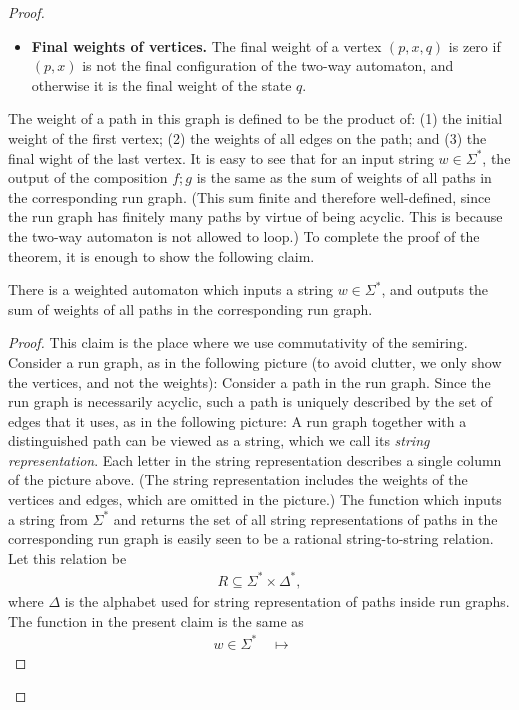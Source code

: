 \begin{proof}
\begin{itemize}
        \item \textbf{Final weights of vertices.} The final weight of a vertex $(p,x,q)$ is zero if $(p,x)$ is not the final configuration of the two-way automaton, and otherwise it is the final weight of the state $q$.
    \end{itemize}
The weight of a path in this graph is defined to be the product of: (1) the initial weight of the first vertex; (2) the weights of all edges on the path; and (3) the final wight of the last vertex. It is  easy to see that for an input string $w \in \Sigma^*$, the output of the composition $f;g$ is the same as the sum of weights of all paths in the corresponding run graph.  (This sum finite and therefore well-defined, since the run graph has finitely many paths by virtue of being  acyclic. This is because the two-way automaton is not allowed to loop.) To complete the proof of the theorem, it is enough to show the following claim.
\begin{claim}
    There is a weighted automaton which inputs a string $w \in \Sigma^*$, and outputs the sum of weights of all paths in the corresponding run graph.
\end{claim}
\begin{proof}
    This claim is the place where we use commutativity of the semiring. Consider a run graph, as in the following picture (to avoid clutter, we only show the vertices, and not the weights):
    Consider a path in the run graph. Since the run graph is necessarily acyclic, such a path is uniquely described by the set of edges that it uses, as in the   following picture:  
    A run graph together with a distinguished path can be viewed as a string, which we call its \emph{string representation}. Each letter in the string representation describes a single column of the picture above. (The string representation includes the weights of the vertices and edges, which are omitted in the picture.)     The function which inputs a string from $\Sigma^*$ and returns the set of all string representations of paths in the corresponding run graph is easily seen to be a rational string-to-string relation. Let this relation be 
    \begin{align*}
    R \subseteq \Sigma^* \times \Delta^*,
    \end{align*}
    where $\Delta$ is the alphabet used for string representation of paths inside run graphs. The function in the present claim is the same as 
    \begin{align*}
    w \in \Sigma^* 
    \quad \mapsto \quad 

\end{align*}
\end{proof}
\end{proof}
